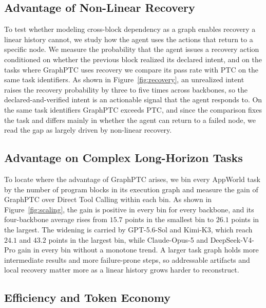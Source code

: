 \subsection{Advantage of Non-Linear Recovery}

To test whether modeling cross-block dependency as a graph enables recovery a linear history cannot, we study how the agent uses the actions that return to a specific node.
We measure the probability that the agent issues a recovery action conditioned on whether the previous block realized its declared intent, and on the tasks where GraphPTC uses recovery we compare its pass rate with PTC on the same task identifiers.
As shown in Figure~\ref{fig:recovery}, an unrealized intent raises the recovery probability by three to five times across backbones, so the declared-and-verified intent is an actionable signal that the agent responds to.
On the same task identifiers GraphPTC exceeds PTC, and since the comparison fixes the task and differs mainly in whether the agent can return to a failed node, we read the gap as largely driven by non-linear recovery.

\subsection{Advantage on Complex Long-Horizon Tasks}

To locate where the advantage of GraphPTC arises, we bin every AppWorld task by the number of program blocks in its execution graph and measure the gain of GraphPTC over Direct Tool Calling within each bin.
As shown in Figure~\ref{fig:scaling}, the gain is positive in every bin for every backbone, and its four-backbone average rises from $15.7$ points in the smallest bin to $26.1$ points in the largest.
The widening is carried by GPT-5.6-Sol and Kimi-K3, which reach $24.1$ and $43.2$ points in the largest bin, while Claude-Opus-5 and DeepSeek-V4-Pro gain in every bin without a monotone trend.
A larger task graph holds more intermediate results and more failure-prone steps, so addressable artifacts and local recovery matter more as a linear history grows harder to reconstruct.

\subsection{Efficiency and Token Economy}

